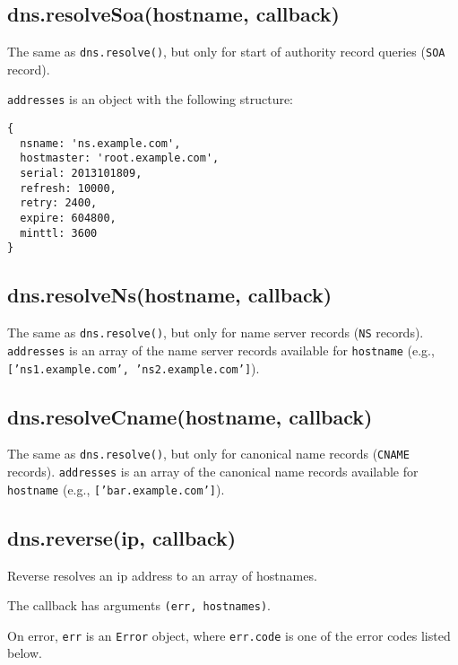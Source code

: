 \subsection{dns.resolveSoa(hostname,
callback)}\label{dns.resolvesoahostname-callback}

The same as \texttt{dns.resolve()}, but only for start of authority
record queries (\texttt{SOA} record).

\texttt{addresses} is an object with the following structure:

\begin{verbatim}
{
  nsname: 'ns.example.com',
  hostmaster: 'root.example.com',
  serial: 2013101809,
  refresh: 10000,
  retry: 2400,
  expire: 604800,
  minttl: 3600
}
\end{verbatim}

\subsection{dns.resolveNs(hostname,
callback)}\label{dns.resolvenshostname-callback}

The same as \texttt{dns.resolve()}, but only for name server records
(\texttt{NS} records). \texttt{addresses} is an array of the name server
records available for \texttt{hostname} (e.g.,
\texttt{{[}'ns1.example.com', 'ns2.example.com'{]}}).

\subsection{dns.resolveCname(hostname,
callback)}\label{dns.resolvecnamehostname-callback}

The same as \texttt{dns.resolve()}, but only for canonical name records
(\texttt{CNAME} records). \texttt{addresses} is an array of the
canonical name records available for \texttt{hostname} (e.g.,
\texttt{{[}'bar.example.com'{]}}).

\subsection{dns.reverse(ip, callback)}\label{dns.reverseip-callback}

Reverse resolves an ip address to an array of hostnames.

The callback has arguments \texttt{(err, hostnames)}.

On error, \texttt{err} is an \texttt{Error} object, where
\texttt{err.code} is one of the error codes listed below.

